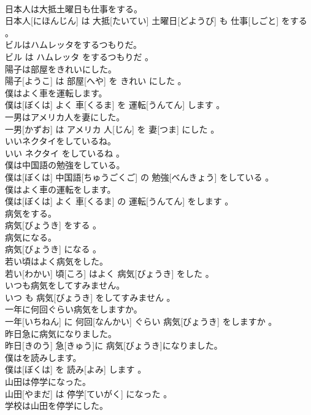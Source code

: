 \documentclass[8pt]{extreport}
\begin{document}
\begin{CJK}{UTF8}{min}
\\	日本人は大抵土曜日も仕事をする。	
\\	日本人[にほんじん] は 大抵[たいてい] 土曜日[どようび] も 仕事[しごと] をする 。
\\	ビルはハムレッタをするつもりだ。	
\\	ビル は ハムレッタ をするつもりだ 。
\\	陽子は部屋をきれいにした。	
\\	陽子[ようこ] は 部屋[へや] を きれい にした 。
\\	僕はよく車を運転します。	
\\	僕は[ぼくは] よく 車[くるま] を 運転[うんてん] します 。
\\	一男はアメリカ人を妻にした。	
\\	一男[かずお] は アメリカ 人[じん] を 妻[つま] にした 。
\\	いいネクタイをしているね。	
\\	いい ネクタイ をしているね 。
\\	僕は中国語の勉強をしている。	
\\	僕は[ぼくは] 中国語[ちゅうごくご] の 勉強[べんきょう] をしている 。
\\	僕はよく車の運転をします。	
\\	僕は[ぼくは] よく 車[くるま] の 運転[うんてん] をします 。
\\	病気をする。	
\\	病気[びょうき] をする 。
\\	病気になる。	
\\	病気[びょうき] になる 。
\\	若い頃はよく病気をした。	
\\	若い[わかい] 頃[ころ] はよく 病気[びょうき] をした 。
\\	いつも病気をしてすみません。	
\\	いつ も 病気[びょうき] をしてすみません 。
\\	一年に何回ぐらい病気をしますか。	
\\	一年[いちねん] に 何回[なんかい] ぐらい 病気[びょうき] をしますか 。
\\	昨日急に病気になりました。	
\\	昨日[きのう] 急[きゅう]に 病気[びょうき]になりました。
\\	僕はを読みします。	
\\	僕は[ぼくは] を 読み[よみ] します 。
\\	山田は停学になった。	
\\	山田[やまだ] は 停学[ていがく] になった 。
\\	学校は山田を停学にした。	

\end{CJK}
\end{document}

